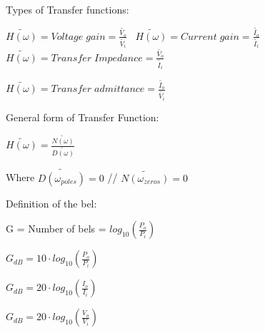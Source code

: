 \documentclass[11pt]{article}
\begin{document}
 



\begin{subsection}{Types of Transfer functions:}

$\tilde{H(\omega)} =  Voltage \; gain = \frac{\tilde{V_o}}{\tilde{V_i}}$ \
$\tilde{H(\omega)} =  Current  \; gain = \frac{\tilde{I_o}}{\tilde{I_i}}$ \
$\tilde{H(\omega)} =  Transfer \; Impedance = \frac{\tilde{V_o}}{\tilde{I_i}}$ \

$\tilde{H(\omega)} =  Transfer \; admittance = \frac{\tilde{I_o}}{\tilde{V_i}}$ \


\begin{subsection}{General form of Transfer Function:}

$\tilde{H(\omega)} = \frac{\tilde{N(\omega)}}{\tilde{D(\omega)}}$

Where $\tilde{D(\omega_{poles})} = 0 $ //
	$\tilde{N(\omega_{zeros})} = 0$ 
			

\end{subsection}
\end{subsection}


\begin{subsection}{Definition of the bel:}

G = Number of bels = $log_{10}(\frac{P_o}{P_i})$

$G_{dB} =  10 \cdot log_{10}(\frac{P_o}{P_i})$

$G_{dB} = 20 \cdot log_{10}(\frac{I_o}{I_i}) $

$G_{dB} = 20 \cdot log_{10}(\frac{V_o}{V_i}) $


\end{subsection}
\end{document}
